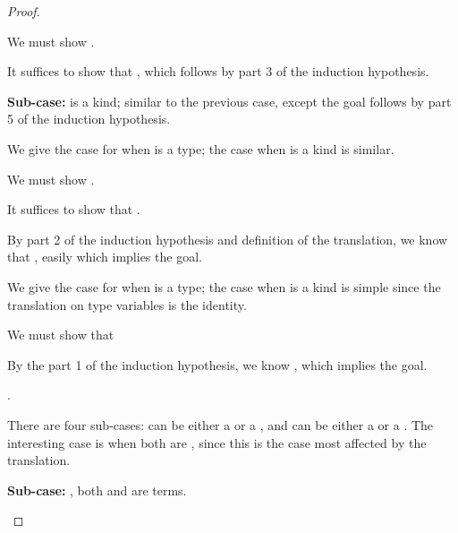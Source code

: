 {\begin{proof}
\begin{proofcases}
    We must show \im{\cpswf{\slenv^+,\cpsx:\sA^+}}.

    It suffices to show that \im{\cpstyjudg{\slenv^+}{\sA^+}{\cpsK}}, which follows by
    part 3 of the induction hypothesis.

    \item[{\bfseries Sub-case:}] \im{\sA} is a kind; similar to the previous case, except the goal follows by part 5 of
    the induction hypothesis.

    \item {} \im{\swf{\slenv,\sx = \se:\sA}}

    We give the case for when \im{\sA} is a type; the case when \im{\sA} is a kind is
    similar.

    We must show \im{\cpswf{\slenv^+,\cpsx = \cpsncappe{\se^\div}{\sA^+}{\cpsidk}:\sA^+}}.

    It suffices to show that
    \im{\cpstyjudg{\slenv^+}{\cpsncappe{\se^\div}{\sA^+}{\cpsidk}}{\sA^+}}.

    By part 2 of the induction hypothesis and definition of the translation, we know that
    \im{\cpstyjudg{\slenv^+}{\se^{\div}}{\cpspity{\cpsalpha}{\cpsstarty}{\cpsfunty{(\cpsfunty{\sA^+}{\cpsalpha})}{\cpsalpha}}}},
    easily which implies the goal.

    \item {} \im{\styjudg{\slenv}{\sx}{\sA}}

    We give the case for when \im{\sA} is a type; the case when \im{\sA} is a
    kind is simple since the translation on type variables is the identity.

    We must show that
    \im{\cpstyjudg{\slenv^+}{\cpsfune{\cpsalpha}{\cpsstarty}{\cpsfune{\cpsk}{\cpsfunty{\sA^+}{\cpsalpha}}{\cpsappe{\cpsk}{\cpsx}}}}{\sA^\div}}

    By the part 1 of the induction hypothesis, we know
    \im{\cpstyjudg{\slenv^+}{\cpsx}{\sA^+}}, which implies the goal.

    \item {}
    \im{\styjudg{\slenv}{\sappe{\seone}{\setwo}}{\subst{\sB}{\setwo}{\sx}}}.

    There are four sub-cases: \im{\seone} can be either a  or a , and \im{\setwo}
    can be either a  or a .
    The interesting case is when both are , since this is the case most
    affected by the  translation.

    \item[{\bfseries Sub-case:}] , both \im{\seone} and \im{\setwo} are terms.


\end{proofcases}
\end{proof}}
